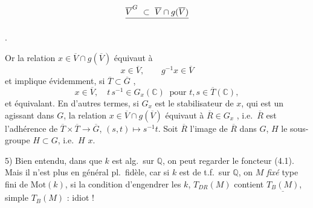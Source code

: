 \documentclass[11pt,a4paper]{article}
\begin{document}
\[ \struck{\overline{V}^{G} \ \subset \ \overline{V} \cap g(\overline{V})} \]

.

Or la relation $x \in \overline{V} \cap g(\overline{V})$ équivaut à
\[ x \in \overline{V}, \qquad g^{-1} x \in \overline{V} \]
et implique évidemment, si $\overline{T} \subset \overline{G}$
 ,
\[ x \in \overline{V} , \quad t\, s^{-1} \in G_{x}(\mathbb{C}) \ \text{ pour } t, s \in \overline{T}(\mathbb{C}) , \]
et \struck{$= \gamma$} équivalant. En d'autres termes, si $G_{x}$ est le
stabilisateur de $x$, qui est un \ill{} agissant dans $G$, la relation
$x \in \overline{V} \cap g(\overline{V})$ équivaut à
$\overline{R} \in G_{x}$ \struck{\ill{}}, i.e.\ $\overline{R}$ est l'adhérence de
$\overline{T} \times \overline{T} \to \overline{G}$, $(s,t) \mapsto s^{-1} t$.
Soit $\overline{R}$ l'image de $\overline{R}$ dans $G$, $H$ le sous-groupe
\struck{\ill{}} $H \subset G$, i.e.\ $H$ \ill{} $x$.

\struck{\ill{}}





5) Bien entendu, dans \ill{} que $k$ est alg.\ sur $\mathbb{Q}$, on peut regarder
le foncteur (4.1). Mais il n'est plus en général pl.\ fidèle,
 car si $k$ est de t.f.\ sur $\mathbb{Q}$, on
 $M$ \emph{fixé}  type fini \ill{} de
$\mathrm{Mot}(k)$, si la condition d'engendrer les $k$, 
$T_{DR}(M)$ contient $\underline{T_{B}(M)}$,  \ill{} \ill{} \ill{}
simple \ill{} $T_{B}(M)$ : idiot !
\end{document}
